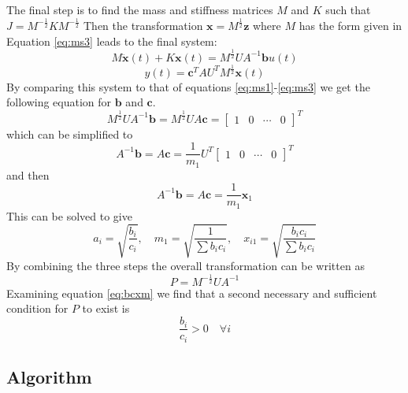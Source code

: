 \documentclass{mbd_fullpaper}
\begin{document}
The final step is to find the mass and stiffness matrices $M$ and $K$ such that $J =  M^{-\frac{1}{2}} K M^{-\frac{1}{2}}$ 
Then the transformation $\mathbf{x} = M^{\frac{1}{2}} \mathbf{z}$ where $M$ has the form given in Equation \ref{eq:ms3} leads to the final system:
\begin{equation}
M \ddot{\mathbf{x}}(t) + K \mathbf{x}(t) = M^{\frac{1}{2}} U A^{-1} \mathbf{b} u(t)
\label{eq:fin1}
\end{equation}
\begin{equation}
y(t) = \mathbf{c}^T  A U^T M^{\frac{1}{2}}\mathbf{x}(t)
\label{eq:fin2}
\end{equation}
By comparing this system to that of equations \ref{eq:ms1}-\ref{eq:ms3} we get the following equation for $\mathbf{b}$ and $\mathbf{c}$.
\begin{equation}
M^{\frac{1}{2}} U A^{-1} \mathbf{b} = M^{\frac{1}{2}} U A \mathbf{c} = \begin{bmatrix} 1 &  0 & \cdots & 0 \end{bmatrix}^T
\label{eq:bhat}
\end{equation}
which can be simplified to
\begin{equation}
A^{-1} \mathbf{b} = A \mathbf{c} = \frac{1}{m_1} U^T \begin{bmatrix} 1 &  0 & \cdots & 0 \end{bmatrix}^T
\label{eq:bc1}
\end{equation}
and then
\begin{equation}
A^{-1} \mathbf{b} = A \mathbf{c} = \frac{1}{m_1} \mathbf{x}_1
\label{eq:bc2}
\end{equation}
This can be solved to give
\begin{equation}
a_i = \sqrt{\frac{b_i}{c_i}} ,\quad m_1 = \sqrt{\frac{1}{\sum b_i c_i}} ,\quad x_{i1} = \sqrt{\frac{b_i c_i}{\sum b_i c_i}}
\label{eq:bcxm}
\end{equation}
By combining the three steps the overall transformation can be written as
\begin{equation}
P =  M^{-\frac{1}{2}} U A^{-1}
\label{eq:p}
\end{equation}
Examining equation \ref{eq:bcxm} we find that a second necessary and sufficient condition for $P$ to exist is
\begin{equation}
\frac{b_i}{c_i} > 0 \quad \forall i
\end{equation}

\subsection{Algorithm}
\end{document}

